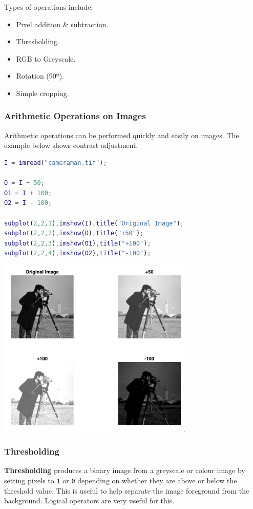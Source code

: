 \documentclass[11pt]{article}
\begin{document}
Types of operations include:
\begin{itemize}
    \item   Pixel addition \& subtraction. 
    \item   Thresholding. 
    \item   RGB to Greyscale. 
    \item   Rotation (90º).
    \item   Simple cropping.
\end{itemize}

\subsubsection{Arithmetic Operations on Images}
Arithmetic operations can be performed quickly and easily on images. 
The example below shows contrast adjustment.
\begin{lstlisting}[language=MATLAB]
I = imread("cameraman.tif"); 

O = I + 50; 
O1 = I + 100; 
O2 = I - 100; 

subplot(2,2,1),imshow(I),title("Original Image"); 
subplot(2,2,2),imshow(O),title("+50"); 
subplot(2,2,3),imshow(O1),title("+100");
subplot(2,2,4),imshow(O2),title("-100"); 
\end{lstlisting}

\begin{center}
    \includegraphics[width=0.7\textwidth]{arithmeticoperationsonimages.png}
\end{center}

\subsubsection{Thresholding}
\textbf{Thresholding} produces a binary image from a greyscale or colour image by setting pixels to \verb|1| or \verb|0| depending on 
whether they are above or below the threshold value.
This is useful to help separate the image foreground from the background.
Logical operators are very useful for this.
\end{document}
